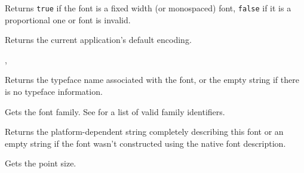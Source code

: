 \label{wxfontisfixedwidth}


Returns {\tt true} if the font is a fixed width (or monospaced) font, 
{\tt false} if it is a proportional one or font is invalid.


\label{wxfontgetdefaultencoding}


Returns the current application's default encoding.


, 


\label{wxfontgetfacename}


Returns the typeface name associated with the font, or the empty string if there is no
typeface information.




\label{wxfontgetfamily}


Gets the font family. See  for a list of valid
family identifiers.




\label{wxfontgetnativefontinfodesc}


Returns the platform-dependent string completely describing this font or an
empty string if the font wasn't constructed using the native font description.




\label{wxfontgetpointsize}


Gets the point size.

